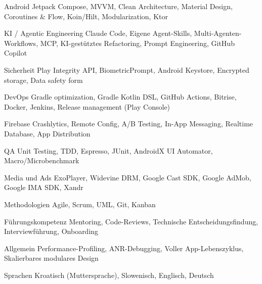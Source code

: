 

\begin{cvskills}

\cvskill
  {Android}
  {Jetpack Compose, MVVM, Clean Architecture, Material Design, Coroutines \& Flow, Koin/Hilt, Modularization, Ktor}

\cvskill
  {KI / Agentic Engineering}
  {Claude Code, Eigene Agent-Skills, Multi-Agenten-Workflows, MCP, KI-gestütztes Refactoring, Prompt Engineering, GitHub Copilot}
  
\cvskill
  {Sicherheit}
  {Play Integrity API, BiometricPrompt, Android Keystore, Encrypted storage, Data safety form}
   
 \cvskill
  {DevOps}
  {Gradle optimization, Gradle Kotlin DSL, GitHub Actions, Bitrise, Docker, Jenkins, Release management (Play Console)}

\cvskill
  {Firebase}
  {Crashlytics, Remote Config, A/B Testing, In-App Messaging, Realtime Database, App Distribution}

\cvskill
  {QA}
  {Unit Testing, TDD, Espresso, JUnit, AndroidX UI Automator, Macro/Microbenchmark}

\cvskill
  {Media und Ads}
  {ExoPlayer, Widevine DRM, Google Cast SDK, Google AdMob, Google IMA SDK, Xandr}
  

 

\cvskill
{Methodologien}
  {Agile, Scrum, UML, Git, Kanban}
  
  \cvskill
{Führungskompetenz}
  {Mentoring, Code-Reviews, Technische Entscheidungsfindung, Interviewführung, Onboarding}

\cvskill
{Allgemein}
  {Performance-Profiling, ANR-Debugging, Voller App-Lebenszyklus, Skalierbares modulares Design}

\cvskill
  {Sprachen}
  {Kroatisch (Muttersprache), Slowenisch, Englisch, Deutsch}
\end{cvskills}
